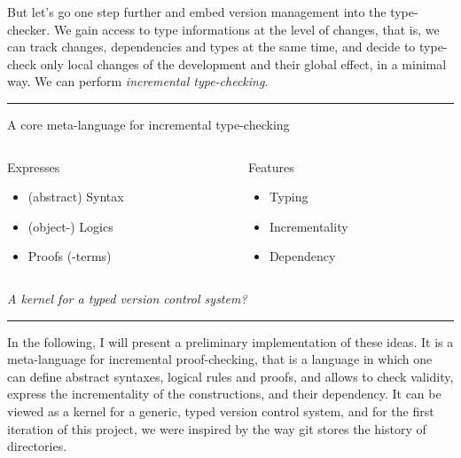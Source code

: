 \documentclass[ignorenonframetext,red]{beamer}
\begin{document}
But let's go one step further and embed version management into the
type-checker. We gain access to type informations at the level of
changes, that is, we can track changes, dependencies and types at the
same time, and decide to type-check only local changes of the
development and their global effect, in a minimal way. We can perform
\emph{incremental type-checking}.

\hrule
\begin{frame}{A core meta-language for incremental type-checking}
  \begin{columns}[t]
    \begin{column}{0.5\textwidth}
      \begin{block}{Expresses}
        \begin{itemize}
        \item (abstract) Syntax
        \item (object-) Logics
        \item Proofs (-terms)
        \end{itemize}
      \end{block}
    \end{column}
    \begin{column}{0.5\textwidth}
      \begin{block}{Features}
        \begin{itemize}
        \item Typing
        \item Incrementality
        \item Dependency
        \end{itemize}
      \end{block}
    \end{column}
  \end{columns}
  \vspace{2em}
  \begin{center}
    \emph{A kernel for a typed version control system?}
  \end{center}
\end{frame}
\hrule

In the following, I will present a preliminary implementation of these
ideas. It is a meta-language for incremental proof-checking, that is a
language in which one can define abstract syntaxes, logical rules and
proofs, and allows to check validity, express the incrementality of
the constructions, and their dependency. It can be viewed as a kernel
for a generic, typed version control system, and for the first
iteration of this project, we were inspired by the way \textsf{git}
stores the history of directories.
\end{document}
